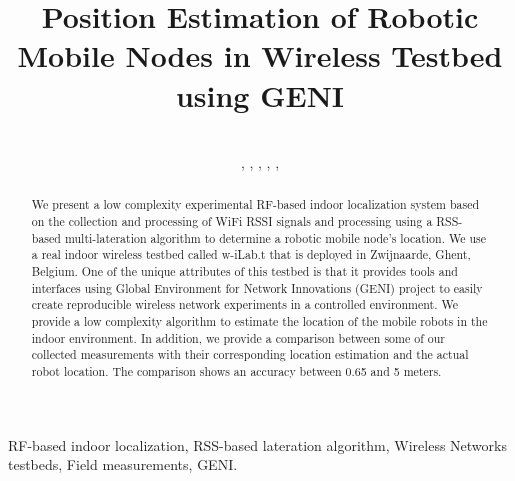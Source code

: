 \documentclass[journal]{IEEEtran} 				\IEEEoverridecommandlockouts 						\usepackage{amsmath,amssymb}
\begin{document}
\title{Position Estimation of Robotic Mobile Nodes in Wireless Testbed using GENI}
\author{
    \\
    ,
    ,
    ,
    ,
    ,
    \\
}

\maketitle


\begin{abstract}
We present a low complexity experimental RF-based indoor localization system based on the collection and processing of WiFi RSSI signals and processing using a RSS-based multi-lateration algorithm to determine a robotic mobile node's location. We use a real indoor wireless testbed called w-iLab.t that is deployed in Zwijnaarde, Ghent, Belgium. One of the unique attributes of this testbed is that it provides tools and interfaces using Global Environment for Network Innovations (GENI) project to easily create reproducible wireless network experiments in a controlled environment. We provide a low complexity algorithm to estimate the location of the mobile robots in the indoor environment. In addition, we provide a comparison between some of our collected measurements with their corresponding location estimation and the actual robot location. The comparison shows an accuracy between 0.65 and 5 meters. 

\end{abstract}

\begin{keywords}
RF-based indoor localization, RSS-based lateration algorithm, Wireless Networks testbeds, Field measurements, GENI.
\end{keywords}
\end{document}

